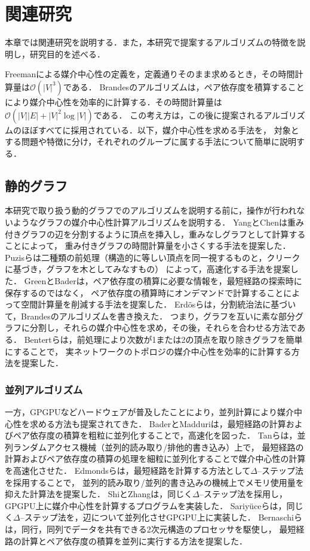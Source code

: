
\chapter{関連研究}
\label{chap:related-work}

本章では関連研究を説明する．また，本研究で提案するアルゴリズムの特徴を説明し，研究目的を述べる．

Freemanによる媒介中心性の定義を，定義通りそのまま求めるとき，その時間計算量は$\mathcal{O}(|V|^3)$である．
Brandesのアルゴリズム\cite{Brandes2001}は，ペア依存度を積算することにより媒介中心性を効率的に計算する．その時間計算量は$\mathcal{O}(|V||E|+|V|^2\log|V|)$である．
この考え方は，この後に提案されるアルゴリズムのほぼすべてに採用されている．以下，媒介中心性を求める手法を，
対象とする問題や特徴に分け，それぞれのグループに属する手法について簡単に説明する．

\section{静的グラフ}
本研究で取り扱う動的グラフでのアルゴリズムを説明する前に，操作が行われないようなグラフの媒介中心性計算アルゴリズムを説明する．
YangとChen\cite{Yang2011}は重み付きグラフの辺を分割するように頂点を挿入し，重みなしグラフとして計算することによって，
重み付きグラフの時間計算量を小さくする手法を提案した．
Puzisら\cite{Puzis2012}は二種類の前処理（構造的に等しい頂点を同一視するものと，クリークに基づき，グラフを木としてみなすもの）
によって，高速化する手法を提案した．
GreenとBader\cite{Green2013}は，ペア依存度の積算に必要な情報を，最短経路の探索時に保存するのではなく，
ペア依存度の積算時にオンデマンドで計算することによって空間計算量を削減する手法を提案した．
Erd{\"{o}}sら\cite{Erdos2015}は，分割統治法に基づいて，Brandesのアルゴリズムを書き換えた．
つまり，グラフを互いに素な部分グラフに分割し，それらの媒介中心性を求め，その後，それらを合わせる方法である．
Bentertら\cite{Bentert2018}は，前処理により次数が1または2の頂点を取り除きグラフを簡単にすることで，
実ネットワークのトポロジの媒介中心性を効率的に計算する方法を提案した．

\subsection{並列アルゴリズム}
一方，GPGPUなどハードウェアが普及したことにより，並列計算により媒介中心性を求める方法も提案されてきた．
BaderとMadduri\cite{Bader2006}は，最短経路の計算およびペア依存度の積算を粗粒に並列化することで，高速化を図った．
Tanら\cite{Tan2009}は，並列ランダムアクセス機械（並列的読み取り/排他的書き込み）上で，
最短経路の計算およびペア依存度の積算の処理を細粒に並列化することで媒介中心性の計算を高速化させた．
Edmondsら\cite{Edmonds2010}は，最短経路を計算する方法として$\Delta$--ステップ法を採用することで，
並列的読み取り/並列的書き込みの機械上でメモリ使用量を抑えた計算法を提案した．
ShiとZhang\cite{Shi2011}は，同じく$\Delta$--ステップ法を採用し，GPGPU上に媒介中心性を計算するプログラムを実装した．
Sariy{\"{u}}ceら\cite{Sariyuce2013}は，同じく$\Delta$--ステップ法を，辺について並列化させGPGPU上に実装した．
Bernaschiら\cite{Bernaschi2016}は，同行，同列でデータを共有できる2次元構造のプロセッサを駆使し，
最短経路の計算とペア依存度の積算を並列に実行する方法を提案した．

